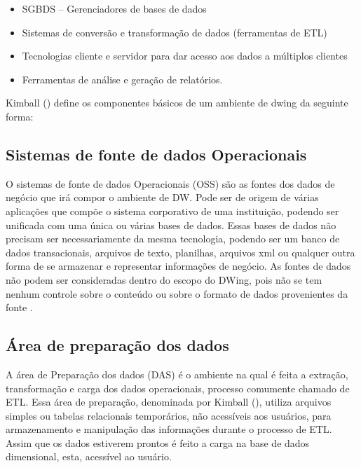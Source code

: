 %

\begin{itemize}
\item SGBDS – Gerenciadores de bases de dados
\item Sistemas de conversão e transformação de dados (ferramentas de ETL)
\item Tecnologias cliente e servidor para dar acesso aos dados a múltiplos clientes
\item Ferramentas de análise e geração de relatórios.
\end{itemize}

%

Kimball (\citeyear{kimball2002}) define os componentes básicos de um ambiente de dwing da seguinte forma:


\subsection{Sistemas de fonte de dados Operacionais}

O sistemas de fonte de dados Operacionais (OSS) são as fontes dos dados de negócio que irá compor o ambiente de DW. Pode ser de origem de várias aplicações que compõe o sistema corporativo de uma instituição, podendo ser unificada com uma única ou várias bases de dados.  Essas bases de dados não precisam ser necessariamente da mesma tecnologia, podendo ser um banco de dados transacionais, arquivos de texto, planilhas, arquivos xml ou qualquer outra forma de se armazenar e representar informações de negócio. As fontes de dados não podem ser consideradas dentro do escopo do DWing, pois  não se tem nenhum controle sobre o conteúdo ou sobre o formato de dados provenientes da fonte \cite{kimball2002}.

\subsection{Área de preparação dos dados}

A área de Preparação dos dados (DAS) é o ambiente na qual é feita a extração, transformação e carga dos dados operacionais, processo comumente chamado de ETL. Essa área de preparação, denominada por Kimball (\citeyear{kimball2002}), utiliza arquivos simples ou tabelas relacionais temporários, não acessíveis aos usuários, para armazenamento e manipulação das informações durante o processo de ETL. Assim que os dados estiverem prontos é feito a carga na base de dados dimensional, esta, acessível ao usuário.

